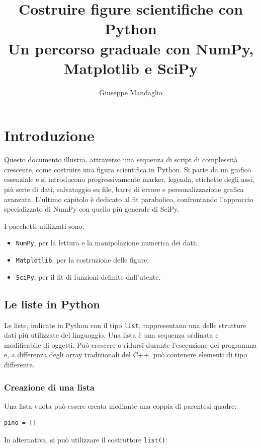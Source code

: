 \documentclass[11pt,a4paper]{book}
\title{Costruire figure scientifiche con Python\\
Un percorso graduale con NumPy, Matplotlib e SciPy}
\author{Giuseppe Mandaglio}
\date{}
\begin{document}
\maketitle
\tableofcontents

\chapter{Introduzione}
Questo documento illustra, attraverso una sequenza di script di complessità crescente, come costruire una figura scientifica in Python. Si parte da un grafico essenziale e si introducono progressivamente marker, legenda, etichette degli assi, più serie di dati, salvataggio su file, barre di errore e personalizzazione grafica avanzata. L'ultimo capitolo è dedicato al fit parabolico, confrontando l'approccio specializzato di NumPy con quello più generale di SciPy.

I pacchetti utilizzati sono:
\begin{itemize}
  \item \texttt{NumPy}, per la lettura e la manipolazione numerica dei dati;
  \item \texttt{Matplotlib}, per la costruzione delle figure;
  \item \texttt{SciPy}, per il fit di funzioni definite dall'utente.
\end{itemize}


\section{Le liste in Python}

Le liste, indicate in Python con il tipo \texttt{list}, rappresentano una delle strutture dati più utilizzate del linguaggio. Una lista è una sequenza ordinata e modificabile di oggetti. Può crescere o ridursi durante l'esecuzione del programma e, a differenza degli array tradizionali del C++, può contenere elementi di tipo differente.

\subsection{Creazione di una lista}

Una lista vuota può essere creata mediante una coppia di parentesi quadre:

\begin{lstlisting}[style=python]
pino = []
\end{lstlisting}

In alternativa, si può utilizzare il costruttore \texttt{list()}:
\end{document}
